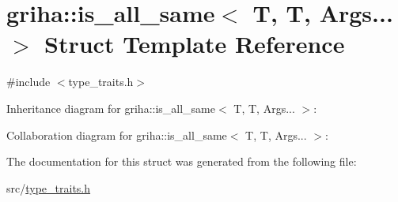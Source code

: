\hypertarget{structgriha_1_1is__all__same_3_01_t_00_01_t_00_01_args_8_8_8_01_4}{}\section{griha\+:\+:is\+\_\+all\+\_\+same$<$ T, T, Args... $>$ Struct Template Reference}
\label{structgriha_1_1is__all__same_3_01_t_00_01_t_00_01_args_8_8_8_01_4}


{\ttfamily \#include $<$type\+\_\+traits.\+h$>$}



Inheritance diagram for griha\+:\+:is\+\_\+all\+\_\+same$<$ T, T, Args... $>$\+:


Collaboration diagram for griha\+:\+:is\+\_\+all\+\_\+same$<$ T, T, Args... $>$\+:


The documentation for this struct was generated from the following file\+:\begin{DoxyCompactItemize}
\item 
src/\hyperlink{type__traits_8h}{type\+\_\+traits.\+h}\end{DoxyCompactItemize}
